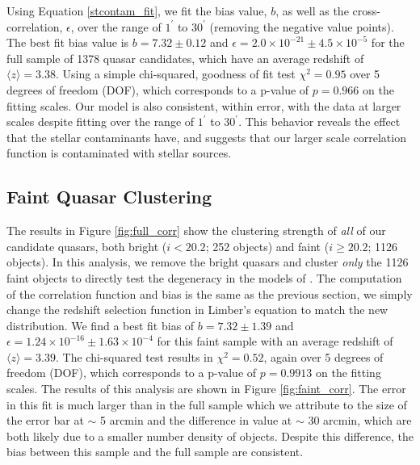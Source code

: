 \documentclass[apj, numberedappendix]{emulateapj}
\begin{document}
Using Equation \ref{stcontam_fit}, we fit the bias value, $b$, as well as the cross-correlation, $\epsilon$, over the range of $1^\prime$ to $30^\prime$ (removing the negative value points). The best fit bias value is $b = 7.32 \pm 0.12$ and $\epsilon = 2.0 \times 10^{-21} \pm 4.5 \times 10^{-5}$ for the full sample of 1378 quasar candidates, which have an average redshift of $\langle z \rangle = 3.38$. Using a simple chi-squared, goodness of fit test $\chi^2 = 0.95$ over 5 degrees of freedom (DOF), which corresponds to a p-value of $p = 0.966$ on the fitting scales. Our model is also consistent, within error, with the data at larger scales despite fitting over the range of $1^\prime$ to $30^\prime$. This behavior reveals the effect that the stellar contaminants have, and suggests that our larger scale correlation function is contaminated with stellar sources. 


\subsection{Faint Quasar Clustering}

The results in Figure \ref{fig:full_corr} show the clustering strength of \emph{all} of our candidate quasars, both bright ($i < 20.2$; 252 objects) and faint ($i \geq 20.2$; 1126 objects). In this analysis, we remove the bright quasars and cluster \emph{only} the 1126 faint objects to directly test the degeneracy in the models of \citet{Hopkins2007}. The computation of the correlation function and bias is the same as the previous section, we simply change the redshift selection function in Limber's equation to match the new distribution. We find a best fit bias of $b = 7.32 \pm 1.39$ and $\epsilon = 1.24 \times 10^{-16} \pm 1.63 \times 10^{-4}$ for this faint sample with an average redshift of $\langle z \rangle = 3.39$. The chi-squared test results in $\chi^2 = 0.52$, again over 5 degrees of freedom (DOF), which corresponds to a p-value of $p = 0.9913$ on the fitting scales. The results of this analysis are shown in Figure \ref{fig:faint_corr}. The error in this fit is much larger than in the full sample which we attribute to the size of the error bar at $\sim$ 5 arcmin and the difference in value at $\sim$ 30 arcmin, which are both likely due to a smaller number density of objects. Despite this difference, the bias between this sample and the full sample are consistent.   
\end{document}
